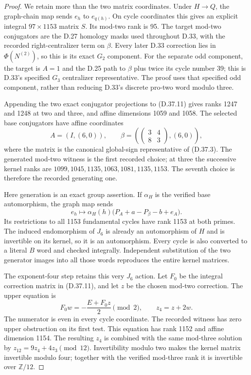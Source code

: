 \begin{proof}
We retain more than the two matrix coordinates. Under
$H\to Q$, the graph-chain map sends $e_h$ to $e_{q(h)}$.
On cycle coordinates this gives an explicit integral
$97\times1153$ matrix $S$. Its mod-two rank is 95. The
target mod-two conjugators are the D.27 homology masks
used throughout D.33, with the recorded right-centralizer
term on $\beta$. Every later D.33 correction lies in
$\Phi(N^{(2)})$, so this is its exact $G_2$ component.
For the separate odd component, the target is $A=1$ and
the D.25 path to $\beta$ plus twice its cycle number 39;
this is D.33's specified $G_3$ centralizer representative.
The proof uses that specified odd component, rather than
reducing D.33's discrete pro-two word modulo three.

Appending the two exact conjugator projections to
(D.37.11) gives ranks 1247 and 1248 at two and three,
and affine dimensions 1059 and 1058. The selected base
conjugators have affine coordinates
\[
 A=(I,(6,0)),\qquad
 \beta=\left(\begin{pmatrix}3&4\\8&3\end{pmatrix},(6,0)\right),
                                                               \tag{D.37.13}
\]
where the matrix is the canonical global-sign representative
of (D.37.3). The generated mod-two witness is the first
recorded choice; at three the successive kernel ranks are
$1099,1045,1135,1063,1081,1135,1153$. The seventh choice
is therefore the recorded generating one.

Here generation is an exact group assertion. If $\alpha_H$
is the verified base automorphism, the graph map sends
\[
 e_h\longmapsto \alpha_H(h)
       \bigl(P_A+a-P_\beta-b+e_A\bigr).                  \tag{D.37.14}
\]
Its restrictions to all 1153 fundamental cycles have rank
1153 at both primes. The induced endomorphism of $J_6$
is already an automorphism of $H$ and is invertible on its
kernel, so it is an automorphism. Every cycle is also
converted to a literal $B$ word and checked integrally.
Independent substitution of the two generator images into
all those words reproduces the entire kernel matrices.

The exponent-four step retains this very $J_6$ action.
Let $F_0$ be the integral correction matrix in (D.37.11),
and let $z$ be the chosen mod-two correction. The upper
equation is
\[
 F_0 w=-\frac{E+F_0z}{2}\pmod2,\qquad z_4=z+2w.           \tag{D.37.15}
\]
The numerator is even in every cycle coordinate. The
recorded witness has zero upper obstruction on its first
test. This equation has rank 1152 and affine dimension
1154. The resulting $z_4$ is combined with the same
mod-three solution by $z_{12}=9z_4+4z_3\pmod{12}$.
Invertibility modulo two makes the kernel matrix invertible
modulo four; together with the verified mod-three rank it
is invertible over $\mathbb Z/12$.


\end{proof}
